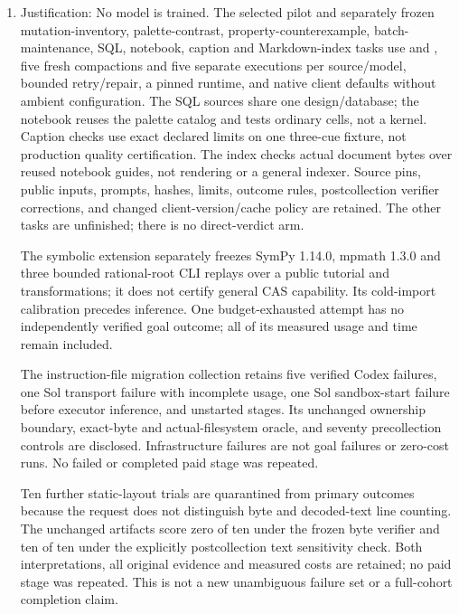 \begin{enumerate}
    \item[] Justification: No model is trained. The selected pilot and separately frozen mutation-inventory, palette-contrast, property-counterexample, batch-maintenance, SQL, notebook, caption and Markdown-index tasks use  and , five fresh compactions and five separate executions per source/model, bounded retry/repair, a pinned runtime, and native client defaults without ambient configuration. The SQL sources share one design/database; the notebook reuses the palette catalog and tests ordinary cells, not a kernel. Caption checks use exact declared limits on one three-cue fixture, not production quality certification. The index checks actual document bytes over reused notebook guides, not rendering or a general indexer. Source pins, public inputs, prompts, hashes, limits, outcome rules, postcollection verifier corrections, and changed client-version/cache policy are retained. The other \CohortUnreviewedTasks{} tasks are unfinished; there is no direct-verdict arm.

    The symbolic extension separately freezes SymPy 1.14.0, mpmath 1.3.0 and three bounded rational-root CLI replays over a public tutorial and transformations; it does not certify general CAS capability. Its cold-import calibration precedes inference. One budget-exhausted attempt has no independently verified goal outcome; all of its measured usage and time remain included.

    The instruction-file migration collection retains five verified Codex failures, one Sol transport failure with incomplete usage, one Sol sandbox-start failure before executor inference, and unstarted stages. Its unchanged ownership boundary, exact-byte and actual-filesystem oracle, and seventy precollection controls are disclosed. Infrastructure failures are not goal failures or zero-cost runs. No failed or completed paid stage was repeated.

    Ten further static-layout trials are quarantined from primary outcomes because the request does not distinguish byte and decoded-text line counting. The unchanged artifacts score zero of ten under the frozen byte verifier and ten of ten under the explicitly postcollection text sensitivity check. Both interpretations, all original evidence and measured costs are retained; no paid stage was repeated. This is not a new unambiguous failure set or a full-cohort completion claim.


\end{enumerate}

